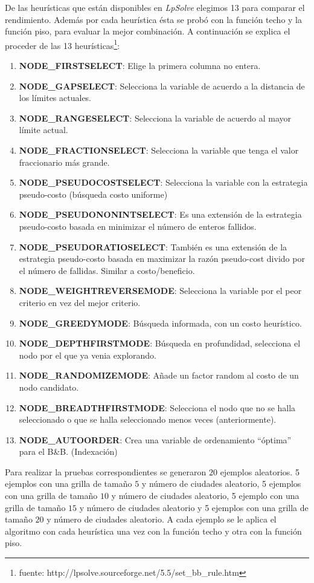 \documentclass[10pt]{article}
\begin{document}
De las heurísticas que están disponibles en \emph{LpSolve} elegimos 13 para comparar el rendimiento. Además por cada heurística ésta se probó con la función techo y la función piso, para 
evaluar la mejor combinación. A continuación se explica el proceder de las 13 heurísticas\footnote{fuente: http://lpsolve.sourceforge.net/5.5/set\_bb\_rule.htm}:

\begin{enumerate}
 \item \textbf{NODE\_FIRSTSELECT}: Elige la primera columna no entera.%
 \item \textbf{NODE\_GAPSELECT}: Selecciona la variable de acuerdo a la distancia de los límites actuales.%
 \item \textbf{NODE\_RANGESELECT}: Selecciona la variable de acuerdo al mayor límite actual.%
 \item \textbf{NODE\_FRACTIONSELECT}: Selecciona la variable que tenga el valor fraccionario más grande.%
 \item \textbf{NODE\_PSEUDOCOSTSELECT}: Selecciona la variable con la estrategia pseudo-costo (búsqueda costo uniforme)%
 \item \textbf{NODE\_PSEUDONONINTSELECT}: Es una extensión de la estrategia pseudo-costo basada en minimizar el número de enteros fallidos.%
 \item \textbf{NODE\_PSEUDORATIOSELECT}: También es una extensión de la estrategia pseudo-costo basada en maximizar la razón pseudo-cost divido por el número de fallidas. Similar a costo/beneficio.%
 \item \textbf{NODE\_WEIGHTREVERSEMODE}: Selecciona la variable por el peor criterio en vez del mejor criterio.%
 \item \textbf{NODE\_GREEDYMODE}: Búsqueda informada, con un costo heurístico.%
 \item \textbf{NODE\_DEPTHFIRSTMODE}: Búsqueda en profundidad, selecciona el nodo por el que ya venia explorando.%
 \item \textbf{NODE\_RANDOMIZEMODE}: Añade un factor random al costo de un nodo candidato.%
 \item \textbf{NODE\_BREADTHFIRSTMODE}: Selecciona el nodo que no se halla seleccionado o que se halla seleccionado menos veces (anteriormente).%
 \item \textbf{NODE\_AUTOORDER}: Crea una variable de ordenamiento ``óptima'' para el B\&B. (Indexación)%
\end{enumerate}


Para realizar la pruebas correspondientes se generaron $20$ ejemplos aleatorios. 5 ejemplos con una grilla de tamaño $5$ y número de ciudades aleatorio, 5 ejemplos con una grilla
de tamaño $10$ y número de ciudades aleatorio, 5 ejemplo con una grilla de tamaño $15$ y número de ciudades aleatorio y 5 ejemplos con una grilla de tamaño $20$ y número de ciudades aleatorio.
A cada ejemplo se le aplica el algoritmo con cada heurística una vez con la función techo y otra con la función piso.\\
\end{document}
